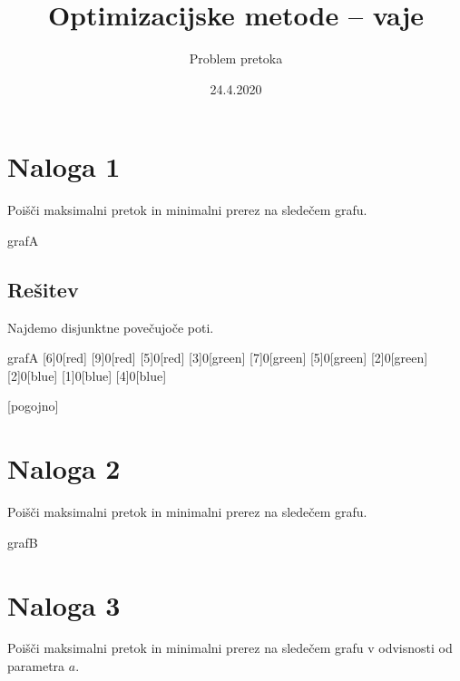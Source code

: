 \documentclass[14pt]{extarticle}
\title{Optimizacijske metode -- vaje}
\author{Problem pretoka}
\date{24.4.2020}
\begin{document}
\maketitle

\section*{Naloga 1}

Poišči maksimalni pretok in minimalni prerez na sledečem grafu.

\begin{pretok}{grafA}
\end{pretok}

\clearpage

\subsection*{Rešitev}

Najdemo disjunktne povečujoče poti.

\begin{pretok}{grafA}
    \nicle
    [6]{0}[red]
    [9]{0}[red]
    [5]{0}[red]
    [3]{0}[green]
    [7]{0}[green]
    [5]{0}[green]
    [2]{0}[green]
    [2]{0}[blue]
    [1]{0}[blue]
    [4]{0}[blue]

    [pogojno]
\end{pretok}

\clearpage

\section*{Naloga 2}

Poišči maksimalni pretok in minimalni prerez na sledečem grafu.

\begin{pretok}{grafB}
\end{pretok}

\clearpage

\section*{Naloga 3}

Poišči maksimalni pretok in minimalni prerez na sledečem grafu v odvisnosti od parametra $a$.
\end{document}
